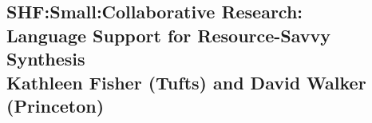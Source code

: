 \documentclass[11pt]{article}
\begin{document}

%

\newpage
{}
\setcounter{page}{1}

\begin{centering}
\section*{{\Large SHF:Small:Collaborative Research: \\ 
           Language Support for Resource-Savvy Synthesis} \\
   {\normalsize Kathleen Fisher (Tufts) and David Walker (Princeton)} }
\end{centering}

\makeatletter
\renewcommand{\paragraph}{%
  \@startsection{paragraph}{4}%
  {\z@}{0.5ex \@plus 0.5ex \@minus .2ex}{-1em}%
  {\normalfont\normalsize\bfseries}%
}
\makeatother



\newpage

\setcounter{page}{1}



\newpage
\end{document}
